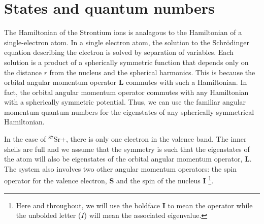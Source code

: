
%



\section{States and quantum numbers}

The Hamiltonian of the Strontium ions is analagous to the Hamiltonian of a single-electron atom. 
In a single electron atom, the solution to the Schr\"odinger equation describing the electron is solved by separation of variables.
 Each solution is a product of a spherically symmetric function that depends only on the distance $r$ from the nucleus and the spherical harmonics.
This is because the orbital angular momentum operator $\mathbf{L}$ commutes with such a Hamiltonian. In fact, the orbital angular momentum operator commutes with any Hamiltonian with a spherically symmetric potential.
Thus, we can use the familiar angular momentum quantum numbers for the eigenstates of any spherically symmetrical Hamiltonian.

In the case of $^{87}$Sr+, there is only one electron in the valence band. The inner shells are full and we assume that the symmetry is such that the eigenstates of the atom will also be eigenstates of the orbital angular momentum operator, $\mathbf{L}$.
 The system also involves two other angular momentum operators: the spin operator for the valence electron, $\mathbf{S}$%
 and the spin of the nucleus $\mathbf{I}$ \footnote{Here and throughout, we will use the boldface $\mathbf{I}$ to mean the operator while the unbolded letter ($I$) will mean the associated eigenvalue.}.


